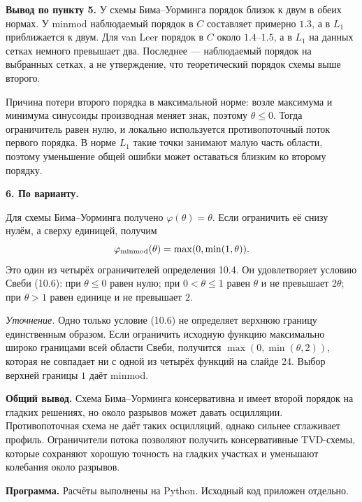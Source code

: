 \documentclass[12pt]{article}
\begin{document}
\noindent\textbf{Вывод по пункту 5.}
У схемы Бима--Уорминга порядок близок к двум в обеих нормах.
У minmod наблюдаемый порядок в $C$ составляет примерно $1.3$,
а в $L_1$ приближается к двум. Для van Leer порядок в $C$
около $1.4$--$1.5$, а в $L_1$ на данных сетках немного превышает два.
Последнее --- наблюдаемый порядок на выбранных сетках, а не утверждение,
что теоретический порядок схемы выше второго.

\noindent Причина потери второго порядка в максимальной норме:
возле максимума и минимума синусоиды производная меняет знак,
поэтому $\theta\le0$. Тогда ограничитель равен нулю, и локально
используется противопоточный поток первого порядка.
В норме $L_1$ такие точки занимают малую часть области,
поэтому уменьшение общей ошибки может оставаться близким ко второму порядку.

\bigskip
\noindent\textbf{6. По варианту.}

\noindent Для схемы Бима--Уорминга получено $\varphi(\theta)=\theta$.
Если ограничить её снизу нулём, а сверху единицей, получим
\begin{equation}
 \varphi_{\rm minmod}(\theta)=\max(0,\min(1,\theta)).
\end{equation}
Это один из четырёх ограничителей определения 10.4.
Он удовлетворяет условию Свеби (10.6): при $\theta\le0$ равен нулю;
при $0<\theta\le1$ равен $\theta$ и не превышает $2\theta$;
при $\theta>1$ равен единице и не превышает $2$.

\noindent\textit{Уточнение.} Одно только условие (10.6) не определяет
верхнюю границу единственным образом. Если ограничить исходную функцию
максимально широко границами всей области Свеби, получится
$\max(0,\min(\theta,2))$, которая не совпадает ни с одной из четырёх
функций на слайде 24. Выбор верхней границы $1$ даёт minmod.

\bigskip
\noindent\textbf{Общий вывод.}
Схема Бима--Уорминга консервативна и имеет второй порядок на гладких
решениях, но около разрывов может давать осцилляции.
Противопоточная схема не даёт таких осцилляций, однако сильнее
сглаживает профиль. Ограничители потока позволяют получить
консервативные TVD-схемы, которые сохраняют хорошую точность
на гладких участках и уменьшают колебания около разрывов.

\noindent\textbf{Программа.} Расчёты выполнены на Python.
Исходный код приложен отдельно.
\end{document}
